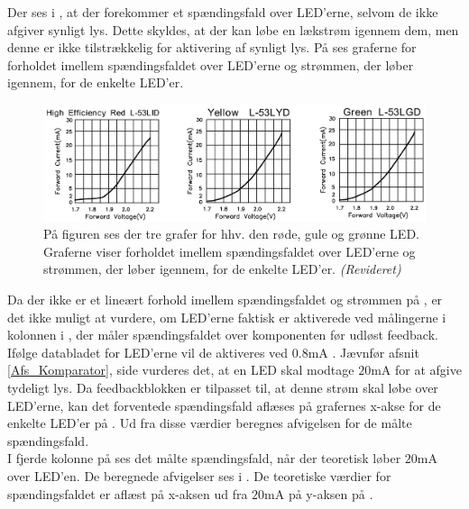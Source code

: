 \noindent Der ses i , at der forekommer et spændingsfald over LED'erne, selvom de ikke afgiver synligt lys. Dette skyldes, at der kan løbe en lækstrøm igennem dem, men denne er ikke tilstrækkelig for aktivering af synligt lys. På  ses graferne for forholdet imellem spændingsfaldet over LED'erne og strømmen, der løber igennem, for de enkelte LED'er. \cite{kingbright}
\begin{figure}[H]
	\centering
	\includegraphics[scale=.45]{figures/cProblemloesning/Samlet_system_LED.PNG}
	\caption{På figuren ses der tre grafer for hhv. den røde, gule og grønne LED. Graferne viser forholdet imellem spændingsfaldet over LED'erne og strømmen, der løber igennem, for de enkelte LED'er. \textit{(Revideret)} \cite{kingbright}}
	\label{fig:samlet_system_LED}
\end{figure}
\noindent Da der ikke er et lineært forhold imellem spændingsfaldet og strømmen på , er det ikke muligt at vurdere, om LED'erne faktisk er aktiverede ved målingerne i kolonnen i , der måler spændingsfaldet over komponenten før udløst feedback. Ifølge databladet for LED'erne vil de aktiveres ved $0.8$mA \cite{kingbright}. Jævnfør afsnit \ref{Afs_Komparator}, side \pageref{Afs_Komparator} vurderes det, at en LED skal modtage $20$mA for at afgive tydeligt lys. Da feedbackblokken er tilpasset til, at denne strøm skal løbe over LED'erne, kan det forventede spændingsfald aflæses på grafernes x-akse for de enkelte LED'er på . Ud fra disse værdier beregnes afvigelsen for de målte spændingsfald. \\
I fjerde kolonne på  ses det målte spændingsfald, når der teoretisk løber $20$mA over LED'en. De beregnede afvigelser ses i . De teoretiske værdier for spændingsfaldet er aflæst på x-aksen ud fra $20$mA på y-aksen på .
